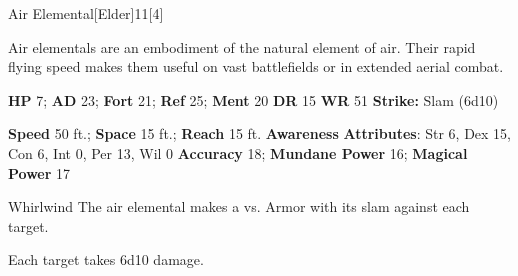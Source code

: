   \begin{monsection}{Air Elemental}[Elder]{11}[4]
    \vspace{-1em}\vspace{-1em}
    \vspace{0em}

    
    Air elementals are an embodiment of the natural element of air.
    Their rapid flying speed makes them useful on vast battlefields or in extended aerial combat.
  

    \begin{spellcontent}
      \begin{spelltargetinginfo}
        \pari \textbf{HP} 7;
          \textbf{AD} 23;
          \textbf{Fort} 21;
          \textbf{Ref} 25;
          \textbf{Ment} 20
        \pari \textbf{DR} 15
        \pari \textbf{WR} 51
        \pari \textbf{Strike:}
            Slam  (6d10)
      \end{spelltargetinginfo}
    \end{spellcontent}
    \begin{monsterfooter}
      \pari \textbf{Speed} 50 ft.;
        \textbf{Space} 15 ft.;
        \textbf{Reach} 15 ft.
      \pari \textbf{Awareness} 
      \pari \textbf{Attributes}:
        Str 6, Dex 15,
        Con 6, Int 0,
        Per 13, Wil 0
      \pari \textbf{Accuracy} 18;
        \textbf{Mundane Power} 16;
      \textbf{Magical Power} 17
    \end{monsterfooter}
  \end{monsection}
  \begin{freeability}{Whirlwind}
       The air elemental makes a 
         vs. Armor
        with its slam against each target.
    
    \hit Each target takes 6d10  damage.
    \end{freeability}
  
